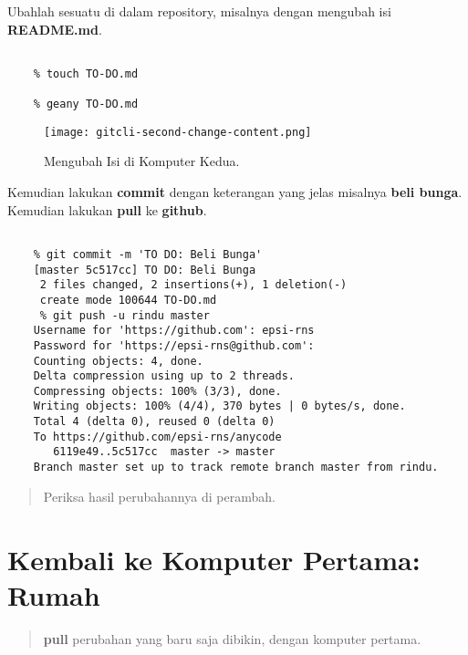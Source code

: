 \documentclass{article}
\begin{document}
\newpage

Ubahlah sesuatu di dalam repository, misalnya dengan
mengubah isi \textbf{README.md}. 

\begin{lstlisting}[style=BashInputStyle]
    % geany README.md

    % touch TO-DO.md

    % geany TO-DO.md
\end{lstlisting}

\begin{figure}[H]
  \texttt{[image: gitcli-second-change-content.png]}
  \caption{Mengubah Isi di Komputer Kedua.}
  \label{fig:git.second}
\end{figure}


\newpage

Kemudian lakukan \textbf{commit}
dengan keterangan yang jelas misalnya \textbf{beli bunga}.
Kemudian lakukan \textbf{pull} ke \textbf{github}.

\begin{lstlisting}[style=BashInputStyle]
    % git add --all

    % git commit -m 'TO DO: Beli Bunga'
    [master 5c517cc] TO DO: Beli Bunga
     2 files changed, 2 insertions(+), 1 deletion(-)
     create mode 100644 TO-DO.md
     % git push -u rindu master
    Username for 'https://github.com': epsi-rns
    Password for 'https://epsi-rns@github.com': 
    Counting objects: 4, done.
    Delta compression using up to 2 threads.
    Compressing objects: 100% (3/3), done.
    Writing objects: 100% (4/4), 370 bytes | 0 bytes/s, done.
    Total 4 (delta 0), reused 0 (delta 0)
    To https://github.com/epsi-rns/anycode
       6119e49..5c517cc  master -> master
    Branch master set up to track remote branch master from rindu.
\end{lstlisting}

\begin{quote}
Periksa hasil perubahannya di perambah.
\end{quote}

\newpage

\section{Kembali ke Komputer Pertama: Rumah}

\begin{quote}
\textbf{pull} perubahan yang baru saja dibikin, dengan komputer pertama.
\end{quote}
\end{document}
